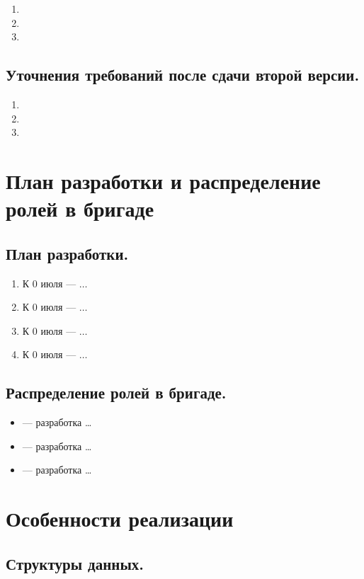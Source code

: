 \begin{enumerate}
	\item 
	\item 
	\item 
\end{enumerate}

\subsection{Уточнения требований после сдачи второй версии.}
\begin{enumerate}
	\item 
	\item 
	\item 
\end{enumerate}

\newpage
\section{План разработки и распределение ролей в бригаде}

\subsection{План разработки.}

\begin{enumerate}
	\item К 0 июля — $\ldots$
	\item К 0 июля — $\ldots$
	\item К 0 июля — $\ldots$
	\item К 0 июля — $\ldots$
\end{enumerate}

\subsection{Распределение ролей в бригаде.}

\begin{itemize}
	\item \firstmember{} — разработка \ldots
	\item \secondmember{} — разработка \ldots
	\item \thirdmember{} — разработка \ldots
\end{itemize}

\newpage
\section{Особенности реализации}
\subsection{Структуры данных.}

